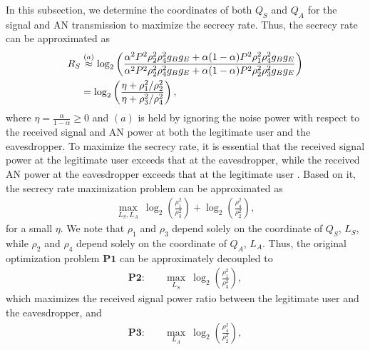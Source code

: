 \documentclass[10pt,technote]{IEEEtran}
\newcommand{\1}{\mathbbm{1}}
\begin{document}
In this subsection, we determine the coordinates of both $Q_S$ and $Q_A$ for the signal and AN transmission to maximize the secrecy rate. Thus, the secrecy rate can be approximated as
\begin{align} \label{eq:RSapprox}
R_S &\overset{(a)}{\approx}\log_2\left(\frac{\alpha^2P^2\rho_2^2\rho_4^2g_Bg_E+\alpha(1-\alpha)P^2\rho_1^2\rho_4^2g_Bg_E}{\alpha^2P^2\rho_2^2\rho_4^2g_Bg_E+\alpha(1-\alpha)P^2\rho_2^2\rho_3^2g_Bg_E}\right) \notag\\
&= \log_2\left(\frac{\eta+{\rho_1^2}/{\rho_2^2}}{\eta+{\rho_3^2}/{\rho_4^2}}\right),
\end{align}
where $\eta = \frac{\alpha}{1-\alpha}\geq 0$ and $(a)$ is held by ignoring the noise power with respect to the received signal and AN power at both the legitimate user and the eavesdropper. %
To maximize the secrecy rate, it is essential that the received signal power at the legitimate user exceeds that at the eavesdropper, while the received AN power at the eavesdropper exceeds that at the legitimate user \cite{zhang2024performanceanalysislowcomplexitybeamforming}. Based on it, the secrecy rate maximization problem can be approximated as
\begin{align}
    \max\limits_{L_S,L_A}\ \log_2\left(\frac{\rho_1^2}{\rho_3^2}\right)+ \log_2\left(\frac{\rho_4^2}{\rho_2^2}\right),
\end{align}
for a small $\eta$. We note that $\rho_1$ and $\rho_3$ depend solely on the coordinate of $Q_S$, $L_S$, while $\rho_2$ and $\rho_4$ depend solely on the coordinate of $Q_A$, $L_A$. Thus, the original optimization problem $\mathbf{P1}$ can be approximately decoupled to
\begin{align}
\mathbf{P2}:\quad &\max\limits_{{L_S}}\  \log_2\left(\frac{\rho_1^2}{\rho_3^2}\right),
\end{align}
which maximizes the received signal power ratio between the legitimate user and the eavesdropper, and
\begin{align}
\mathbf{P3}:\quad &\max\limits_{{L_A}}\  \log_2\left(\frac{\rho_4^2}{\rho_2^2}\right),
\end{align}
\end{document}
